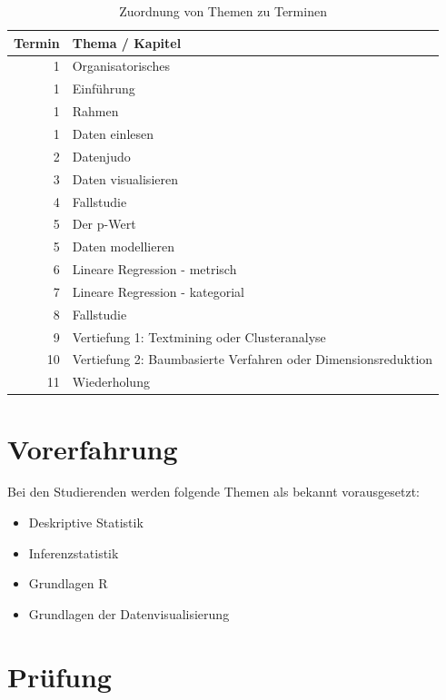 \documentclass[12pt,ngerman,]{book}
\providecommand{\tightlist}{%
  \setlength{\itemsep}{0pt}\setlength{\parskip}{0pt}}
\theoremstyle{definition}
\theoremstyle{definition}
\theoremstyle{remark}
\begin{document}
\begin{table}

\caption{\label{tab:termin-themen}Zuordnung von Themen zu Terminen}
\centering
\begin{tabular}[t]{r|l}
\hline
Termin & Thema / Kapitel\\
\hline
1 & Organisatorisches\\
\hline
1 & Einführung\\
\hline
1 & Rahmen\\
\hline
1 & Daten einlesen\\
\hline
2 & Datenjudo\\
\hline
3 & Daten visualisieren\\
\hline
4 & Fallstudie\\
\hline
5 & Der p-Wert\\
\hline
5 & Daten modellieren\\
\hline
6 & Lineare Regression - metrisch\\
\hline
7 & Lineare Regression - kategorial\\
\hline
8 & Fallstudie\\
\hline
9 & Vertiefung 1: Textmining oder Clusteranalyse\\
\hline
10 & Vertiefung 2: Baumbasierte Verfahren oder Dimensionsreduktion\\
\hline
11 & Wiederholung\\
\hline
\end{tabular}
\end{table}

\section{Vorerfahrung}\label{vorerfahrung}

Bei den Studierenden werden folgende Themen als bekannt vorausgesetzt:

\begin{itemize}
\tightlist
\item
  Deskriptive Statistik
\item
  Inferenzstatistik
\item
  Grundlagen R
\item
  Grundlagen der Datenvisualisierung
\end{itemize}

\section{Prüfung}\label{prufung}
\end{document}
